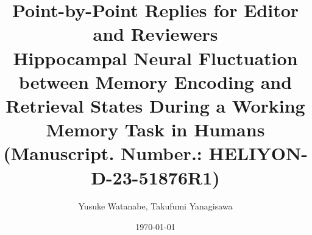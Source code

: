 
\title{
  \fontsize{14pt}{18pt}\selectfont
  Point-by-Point Replies for Editor and Reviewers\\
  Hippocampal Neural Fluctuation between Memory Encoding and Retrieval States During a Working Memory Task in Humans \\
  (Manuscript. Number.: HELIYON-D-23-51876R1)
}
\author{Yusuke Watanabe, Takufumi Yanagisawa}
\date{\today}
\maketitle
